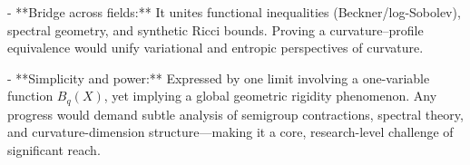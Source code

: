 - **Bridge across fields:**  
  It unites functional inequalities (Beckner/log-Sobolev), spectral geometry, and synthetic Ricci bounds.  Proving a curvature–profile equivalence would unify variational and entropic perspectives of curvature.

- **Simplicity and power:**  
  Expressed by one limit involving a one-variable function \(B_q(X)\), yet implying a global geometric rigidity phenomenon.  Any progress would demand subtle analysis of semigroup contractions, spectral theory, and curvature-dimension structure—making it a core, research-level challenge of significant reach.